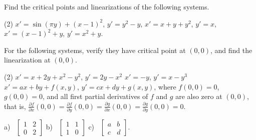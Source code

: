 \pagebreak[2]
\begin{exercise}\ansMark%
Find the critical points and linearizations of the following systems.
\begin{tasks}(2)
\task $x'=\sin(\pi y)+(x-1)^2$, \enspace $y'=y^2-y$,
\task $x'=x+y+y^2$, \enspace $y'=x$,
\task $x'=(x-1)^2+y$, \enspace $y'=x^2+y$.
\end{tasks}
\end{exercise}

\begin{exercise}
For the following systems, verify they have critical point at $(0,0)$,
and find the linearization at $(0,0)$.
\begin{tasks}(2)
\task $x'=x+2y+x^2-y^2$, \enspace $y'=2y-x^2$
\task $x'=-y$, \enspace $y'=x-y^3$
\task* $x'=ax+by+f(x,y)$, $y'=cx+dy+g(x,y)$, where
$f(0,0) = 0$,
$g(0,0) = 0$, and all first partial derivatives of $f$ and $g$ are
also zero at $(0,0)$, that is,
$\frac{\partial f}{\partial x}(0,0) = 
\frac{\partial f}{\partial y}(0,0) = 
\frac{\partial g}{\partial x}(0,0) = 
\frac{\partial g}{\partial y}(0,0) = 0$.
\end{tasks}
\end{exercise}
\comboSol{%
}
{%
a)~ $\left[\begin{smallmatrix} 1 & 2 \\ 0 & 2 \end{smallmatrix}\right]$ \quad b)~ $\left[\begin{smallmatrix} 1 & 1 \\ 1 & 0 \end{smallmatrix}\right]$ \qquad c)~ $\left[\begin{smallmatrix} a & b \\ c & d \end{smallmatrix}\right]$.
}

